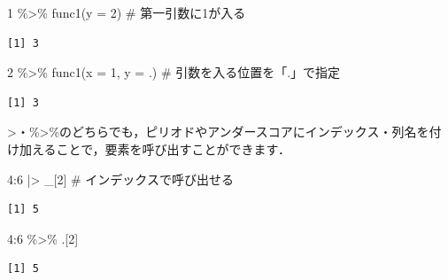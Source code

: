\documentclass[
  letterpaper,
  DIV=11,
  numbers=noendperiod]{scrreprt}
\newenvironment{Shaded}{\begin{snugshade}}{\end{snugshade}}
\newcommand{\AttributeTok}[1]{\textcolor[rgb]{0.40,0.45,0.13}{#1}}
\newcommand{\CommentTok}[1]{\textcolor[rgb]{0.37,0.37,0.37}{#1}}
\newcommand{\DecValTok}[1]{\textcolor[rgb]{0.68,0.00,0.00}{#1}}
\newcommand{\FunctionTok}[1]{\textcolor[rgb]{0.28,0.35,0.67}{#1}}
\newcommand{\NormalTok}[1]{\textcolor[rgb]{0.00,0.23,0.31}{#1}}
\newcommand{\SpecialCharTok}[1]{\textcolor[rgb]{0.37,0.37,0.37}{#1}}
\begin{document}
\begin{Shaded}
\begin{Highlighting}[]
\DecValTok{1} \SpecialCharTok{\%\textgreater{}\%} \FunctionTok{func1}\NormalTok{(}\AttributeTok{y =} \DecValTok{2}\NormalTok{) }\CommentTok{\# 第一引数に1が入る}
\end{Highlighting}
\end{Shaded}

\begin{verbatim}
[1] 3
\end{verbatim}

\begin{Shaded}
\begin{Highlighting}[]
\DecValTok{2} \SpecialCharTok{\%\textgreater{}\%} \FunctionTok{func1}\NormalTok{(}\AttributeTok{x =} \DecValTok{1}\NormalTok{, }\AttributeTok{y =}\NormalTok{ .) }\CommentTok{\# 引数を入る位置を「.」で指定}
\end{Highlighting}
\end{Shaded}

\begin{verbatim}
[1] 3
\end{verbatim}

\textbar\textgreater・\%\textgreater\%のどちらでも，ピリオドやアンダースコアにインデックス・列名を付け加えることで，要素を呼び出すことができます．

\begin{Shaded}
\begin{Highlighting}[]
\DecValTok{4}\SpecialCharTok{:}\DecValTok{6} \SpecialCharTok{|\textgreater{}}\NormalTok{ \_[}\DecValTok{2}\NormalTok{] }\CommentTok{\# インデックスで呼び出せる}
\end{Highlighting}
\end{Shaded}

\begin{verbatim}
[1] 5
\end{verbatim}

\begin{Shaded}
\begin{Highlighting}[]
\DecValTok{4}\SpecialCharTok{:}\DecValTok{6} \SpecialCharTok{\%\textgreater{}\%}\NormalTok{ .[}\DecValTok{2}\NormalTok{]}
\end{Highlighting}
\end{Shaded}

\begin{verbatim}
[1] 5
\end{verbatim}

\begin{Shaded}
\end{Shaded}
\end{document}
